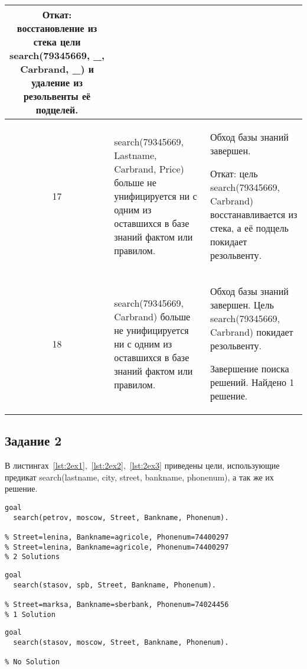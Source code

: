 \begin{longtable}{|c|p{}|p{}|}
        Откат: восстановление из стека цели search(79345669, \_, Carbrand, \_) и удаление из резольвенты её подцелей. \\ \hline

        17 & search(79345669, Lastname, Carbrand, Price) больше не унифицируется ни с одним из оставшихся в базе знаний фактом или правилом. & Обход базы знаний завершен.

        Откат: цель search(79345669, Carbrand) восстанавливается из стека, а её подцель покидает резольвенту.\\ \hline

        18 & search(79345669, Carbrand) больше не унифицируется ни с одним из оставшихся в базе знаний фактом или правилом. & Обход базы знаний завершен. Цель search(79345669, Carbrand) покидает резольвенту.

        Завершение поиска решений. Найдено 1 решение. \\ \hline
\end{longtable}
\normalsize

\subsection{Задание 2}
В листингах~\ref{lst:2ex1},~\ref{lst:2ex2},~\ref{lst:2ex3} приведены цели, использующие предикат search(lastname, city, street, bankname, phonenum), а так же их решение.

\begin{lstlisting}[caption={Пример \textnumero1},label={lst:2ex1}]
goal
  search(petrov, moscow, Street, Bankname, Phonenum).

% Street=lenina, Bankname=agricole, Phonenum=74400297
% Street=lenina, Bankname=agricole, Phonenum=74400297
% 2 Solutions
\end{lstlisting}

\begin{lstlisting}[caption={Пример \textnumero2},label={lst:2ex2}]
goal
  search(stasov, spb, Street, Bankname, Phonenum).

% Street=marksa, Bankname=sberbank, Phonenum=74024456
% 1 Solution
\end{lstlisting}

\begin{lstlisting}[caption={Пример \textnumero3},label={lst:2ex3}]
goal
  search(stasov, moscow, Street, Bankname, Phonenum).

% No Solution
\end{lstlisting}

